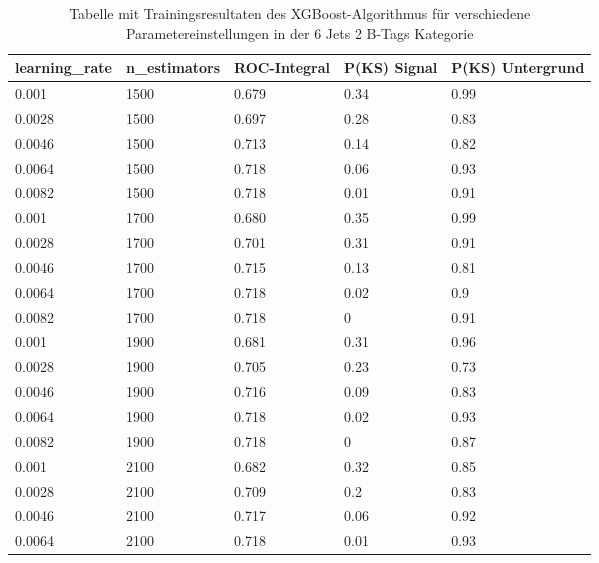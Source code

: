 \begin{table}[tbp]\parbox{12cm}{
  \caption[XGBoost 6j2t Ergebnisse]{Tabelle mit Trainingsresultaten des XGBoost-Algorithmus f\"ur verschiedene Parametereinstellungen in der 6 Jets 2 B-Tags Kategorie}%
  }\label{tab:xgboost_6j2t}
  \begin{center}
  \begin{tabular}{lllll}
  \hline
  learning\_rate & n\_estimators & ROC-Integral & P(KS) Signal & P(KS) Untergrund\\
  \hline
\num{0,001}  & \num{1500} & \num{0,679} & \num{0,34} & \num{0,99}\\
\num{0,0028} & \num{1500} & \num{0,697} & \num{0,28} & \num{0,83}\\
\num{0,0046} & \num{1500} & \num{0,713} & \num{0,14} & \num{0,82}\\
\num{0,0064} & \num{1500} & \num{0,718} & \num{0,06} & \num{0,93}\\
\num{0,0082} & \num{1500} & \num{0,718} & \num{0,01} & \num{0,91}\\
\num{0,001}  & \num{1700} & \num{0,680} & \num{0,35} & \num{0,99}\\
\num{0,0028} & \num{1700} & \num{0,701} & \num{0,31} & \num{0,91}\\
\num{0,0046} & \num{1700} & \num{0,715} & \num{0,13} & \num{0,81}\\
\num{0,0064} & \num{1700} & \num{0,718} & \num{0,02} & \num{0,9}\\
\num{0,0082} & \num{1700} & \num{0,718} & \num{0}    & \num{0,91}\\
\num{0,001}  & \num{1900} & \num{0,681} & \num{0,31} & \num{0,96}\\
\num{0,0028} & \num{1900} & \num{0,705} & \num{0,23} & \num{0,73}\\
\num{0,0046} & \num{1900} & \num{0,716} & \num{0,09} & \num{0,83}\\
\num{0,0064} & \num{1900} & \num{0,718} & \num{0,02} & \num{0,93}\\
\num{0,0082} & \num{1900} & \num{0,718} & \num{0}    & \num{0,87}\\
\num{0,001}  & \num{2100} & \num{0,682} & \num{0,32} & \num{0,85}\\
\num{0,0028} & \num{2100} & \num{0,709} & \num{0,2}  & \num{0,83}\\
\num{0,0046} & \num{2100} & \num{0,717} & \num{0,06} & \num{0,92}\\
\num{0,0064} & \num{2100} & \num{0,718} & \num{0,01} & \num{0,93}\\

\end{tabular}
\end{center}
\end{table}
